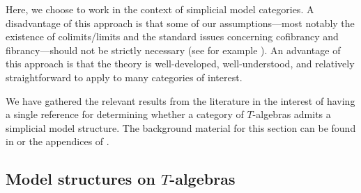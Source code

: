 \documentclass[leqno,oneside,english]{elsarticle}
\begin{document}
Here, we choose to work in the context of simplicial model categories. A
disadvantage of this approach is that some of our assumptions---most
notably the existence of colimits/limits and the standard issues concerning
cofibrancy and fibrancy---should not be strictly
necessary (see for example \cite[\S~6.2]{Lur12}). An advantage of this approach is that the theory is well-developed, well-understood, and relatively straightforward to apply to many
categories of interest. 

We have gathered the relevant results from the
literature in the interest of having a single reference for determining
whether a category of $T$-algebras admits a simplicial model structure.
The background material for this section can be found in
\cite{Qui67,Hov99,Hir03} or the appendices of \cite{Lur09}.

\subsection{Model structures on \texorpdfstring{$T$}{T}-algebras}
\label{sec:model-structures-on-t-algebras}
\end{document}
